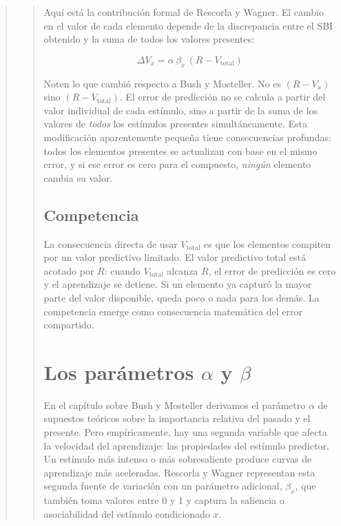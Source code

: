 \documentclass[
  letterpaper,
  DIV=11,
  numbers=noendperiod]{scrreprt}
\begin{document}
\begin{tcolorbox}[enhanced jigsaw, arc=.35mm, bottomrule=.15mm, breakable, colback=white, colframe=quarto-callout-note-color-frame, left=2mm, leftrule=.75mm, opacityback=0, rightrule=.15mm, toprule=.15mm]
\begin{quote}
\begin{quote}
Aquí está la contribución formal de Rescorla y Wagner. El cambio en el
valor de cada elemento depende de la discrepancia entre el SBI obtenido
y la suma de todos los valores presentes:

\[\Delta V_x = \alpha\,\beta_x\,(R - V_{\text{total}})\]

Noten lo que cambió respecto a Bush y Mosteller. No es \((R - V_x)\)
sino \((R - V_{\text{total}})\). El error de predicción no se calcula a
partir del valor individual de cada estímulo, sino a partir de la suma
de los valores de \emph{todos} los estímulos presentes simultáneamente.
Esta modificación aparentemente pequeña tiene consecuencias profundas:
todos los elementos presentes se actualizan con base en el mismo error,
y si ese error es cero para el compuesto, \emph{ningún} elemento cambia
su valor.

\mbox{}%
\subsection{Competencia}\label{competencia}

La consecuencia directa de usar \(V_{\text{total}}\) es que los
elementos compiten por un valor predictivo limitado. El valor predictivo
total está acotado por \(R\): cuando \(V_{\text{total}}\) alcanza \(R\),
el error de predicción es cero y el aprendizaje se detiene. Si un
elemento ya capturó la mayor parte del valor disponible, queda poco o
nada para los demás. La competencia emerge como consecuencia matemática
del error compartido.

\mbox{}%
\section{\texorpdfstring{Los parámetros \(\alpha\) y
\(\beta\)}{Los parámetros \textbackslash alpha y \textbackslash beta}}\label{los-paruxe1metros-alpha-y-beta}

En el capítulo sobre Bush y Mosteller derivamos el parámetro \(\alpha\)
de supuestos teóricos sobre la importancia relativa del pasado y el
presente. Pero empíricamente, hay una segunda variable que afecta la
velocidad del aprendizaje: las propiedades del estímulo predictor. Un
estímulo más intenso o más sobresaliente produce curvas de aprendizaje
más aceleradas. Rescorla y Wagner representan esta segunda fuente de
variación con un parámetro adicional, \(\beta_x\), que también toma
valores entre 0 y 1 y captura la saliencia o asociabilidad del estímulo
condicionado \(x\).


\end{quote}
\end{quote}
\end{tcolorbox}
\end{document}
